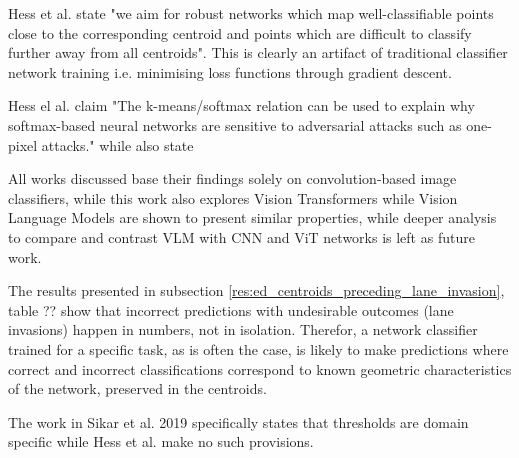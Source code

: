 Hess et al. state "we aim for robust networks which map well-classifiable points close to the corresponding centroid and points which are difficult to classify further away from all centroids". This is clearly an artifact of traditional classifier network training i.e. minimising loss functions through gradient descent.

Hess el al. claim "The k-means/softmax relation can be used to explain why softmax-based neural networks are sensitive to adversarial attacks such as one-pixel attacks." while also state

All works discussed base their findings solely on convolution-based image classifiers, while this work also explores Vision Transformers while Vision Language Models are shown to present similar properties, while deeper analysis to compare and contrast VLM with CNN and ViT networks is left as future work. 

The results presented in subsection \ref{res:ed_centroids_preceding_lane_invasion}, table ?? show that incorrect predictions with undesirable outcomes (lane invasions) happen in numbers, not in isolation. Therefor, a network classifier trained for a specific task, as is often the case, is likely to make predictions where correct and incorrect classifications correspond to known geometric characteristics of the network, preserved in the centroids.

The work in Sikar et al. 2019 specifically states that thresholds are domain specific while Hess et al. make no such provisions.









